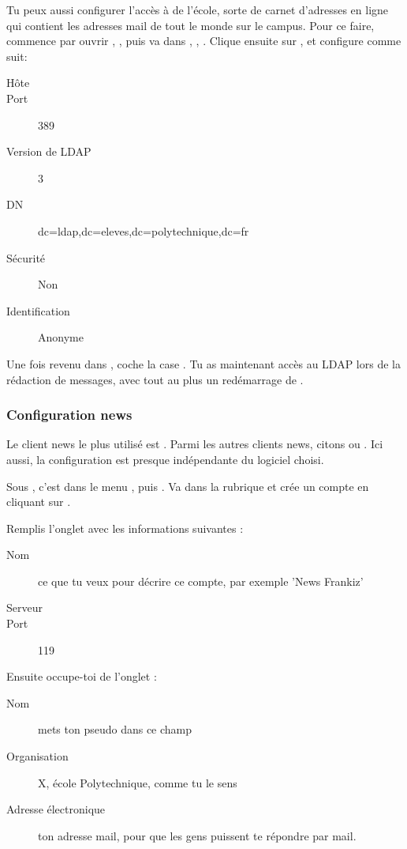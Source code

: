 \par Tu peux aussi configurer l'accès à  de l'école, sorte de carnet d'adresses en ligne qui contient les adresses mail de tout le monde sur le campus. Pour ce faire, commence par ouvrir , , puis va dans , , . Clique ensuite sur , et configure comme suit:
\begin{description}
  \item[Hôte] 
  \item[Port] 389
  \item[Version de LDAP] 3
  \item[DN] dc=ldap,dc=eleves,dc=polytechnique,dc=fr
  \item[Sécurité] Non
  \item[Identification] Anonyme
\end{description}
Une fois revenu dans , coche la case . Tu as maintenant accès au LDAP lors de la
rédaction de messages, avec tout au plus un redémarrage de . 

\subsubsection{Configuration news}
 Le client news le plus
utilisé est . Parmi les autres clients news, citons
 ou . Ici aussi, la configuration est
presque indépendante du logiciel choisi.

Sous , c'est dans le menu , puis . Va dans la rubrique  et
crée un compte en cliquant sur .


Remplis l'onglet  avec les informations suivantes :
\begin{description}
  \item[Nom] ce que tu veux pour décrire ce compte, par exemple 'News Frankiz'
  \item[Serveur] 
  \item[Port] 119
\end{description}
Ensuite occupe-toi de l'onglet  :
\begin{description}
  \item[Nom] mets ton pseudo dans ce champ
  \item[Organisation] X, école Polytechnique, comme tu le sens
  \item[Adresse électronique] ton adresse mail, pour que les gens puissent te répondre par mail.
\end{description}

